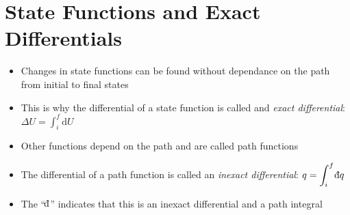 \documentclass[12pt, openany, letterpaper]{memoir}
\begin{document}
\section{State Functions and Exact Differentials}
\begin{itemize}
	\item Changes in state functions can be found without dependance on the path from initial to final states
	\item This is why the differential of a state function is called and \emph{exact differential}: $\Delta U = \displaystyle\int_i^f\mathrm{d}U$
	\item Other functions depend on the path and are called path functions
	\item The differential of a path function is called an \emph{inexact differential}: $q=\displaystyle\int_i^f\dbar q$
	\item The ``$\dbar$'' indicates that this is an inexact differential and a path integral
\end{itemize}
\end{document}

